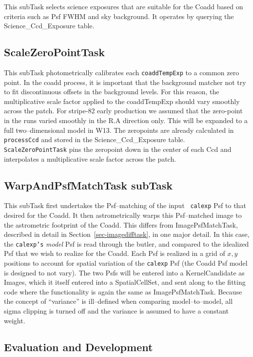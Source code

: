 \documentclass[prd, nofootinbib, floatfix, 11pt,tightenlines,times]{article}
\begin{document}
This subTask selects science exposures that are suitable for the Coadd
based on criteria such as Psf FWHM and sky background. It operates by
querying the Science\_Ccd\_Exposure table.

\subsection{ScaleZeroPointTask} 

This subTask  photometrically calibrates each {\tt coaddTempExp} to a common zero point. 
%
In the coadd process, it is important that the background matcher not try to fit discontinuous offsets in the background levels. For this reason, the multiplicative scale factor applied to the coaddTempExp should vary smoothly across the patch. For stripe-82 early production we assumed that the zero-point in the runs varied smoothly in the R.A direction only.  This will be expanded to a full two--dimensional model in W13.  The zeropoints are already calculated in {\tt processCcd} and stored in the Science\_Ccd\_Exposure table. {\tt ScaleZeroPointTask} pins the zeropoint down in the center of each Ccd and interpolates a multiplicative scale factor across the patch. 

\subsection{WarpAndPsfMatchTask subTask} 

This subTask first undertakes the Psf--matching of the input {\tt
  calexp} Psf to that desired for the Coadd.  It then astrometrically
warps this Psf--matched image to the astrometric footprint of the
Coadd.  This differs from ImagePsfMatchTask, described in detail in
Section~\ref{sec-imagedifftask}, in one major detail.  In this case,
the {\tt calexp's} {\it model} Psf is read through the butler, and
compared to the idealized Psf that we wish to realize for the Coadd.
Each Psf is realized in a grid of $x,y$ positions to account for
spatial variation of the {\tt calexp} Psf (the Coadd Psf model is
designed to not vary).  The two Psfs will be entered into a
KernelCandidate as Images, which it itself entered into a
SpatialCellSet, and sent along to the fitting code where the
functionality is again the same as ImagePsfMatchTask.  Because the
concept of ``variance'' is ill--defined when comparing
model--to--model, all sigma clipping is turned off and the variance is
assumed to have a constant weight.


\subsection{Evaluation and Development}
\end{document}
